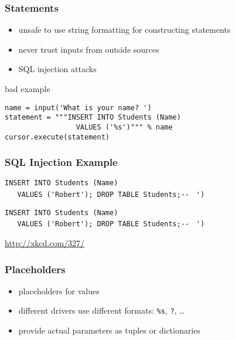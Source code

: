 \documentclass[dvipsnames]{beamer}
\theoremstyle{plain}
\begin{document}
\begin{frame}[fragile]
  \frametitle{Statements}

  \begin{itemize}
    \item unsafe to use string formatting for constructing statements
    \item never trust inputs from outside sources
    \item \alert{SQL injection} attacks
  \end{itemize}

  \medskip
  \begin{exampleblock}{bad example}
    \begin{lstlisting}
name = input('What is your name? ')
statement = """INSERT INTO Students (Name)
                 VALUES ('%s')""" % name
cursor.execute(statement)
    \end{lstlisting}
  \end{exampleblock}
\end{frame}

\begin{frame}[fragile]
  \frametitle{SQL Injection Example}

  \begin{center}
  \end{center}

  \vspace{-6pt}
  \lstinline[language=FullSQL]!INSERT INTO Students (Name)!\\
  \lstinline[language=FullSQL]!   VALUES ('!\alert{\lstinline!Robert'); DROP TABLE Students;-- !}
  \lstinline[language=FullSQL]!')!

  \lstinline[language=FullSQL]!INSERT INTO Students (Name)!\\
  \lstinline[language=FullSQL]!   VALUES ('Robert'); DROP TABLE Students;-- !
  \lstinline[language=FullSQL]!')!

  \begin{tiny}
    \url{http://xkcd.com/327/}
  \end{tiny}
\end{frame}

\begin{frame}[fragile]
  \frametitle{Placeholders}

  \begin{itemize}
    \item placeholders for values
    \item different drivers use different formats:
      \lstinline!%s!, \lstinline!?!, \ldots
    \item provide actual parameters as tuples or dictionaries
  \end{itemize}
\end{frame}
\end{document}
